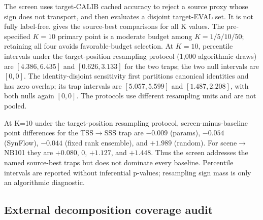 The screen uses target-CALIB cached accuracy to reject a source proxy whose sign
does not transport, and then evaluates a disjoint target-EVAL set. It is not
fully label-free.  gives the source-best comparisons for all
K values. The pre-specified $K=10$ primary point is a moderate budget among
$K=1/5/10/50$; retaining all four avoids favorable-budget selection. At $K=10$,
percentile intervals under the target-position
resampling protocol (1,000 algorithmic draws)
are $[4.386,6.435]$ and $[0.626,3.133]$ for the two traps; the two null intervals
are $[0,0]$. The identity-disjoint sensitivity first partitions canonical
identities and has zero overlap; its trap intervals are $[5.057,5.599]$ and
$[1.487,2.208]$, with both nulls again $[0,0]$. The protocols use different
resampling units and are not pooled.

At K=10 under the target-position resampling protocol,
screen-minus-baseline point
differences for the TSS$\to$SSS trap are $-0.009$ (params), $-0.054$ (SynFlow),
$-0.044$ (fixed rank ensemble), and $+1.989$ (random). For scene$\to$NB101 they
are $+0.080$, $0$, $+1.127$, and $+1.448$. Thus the screen addresses the named
source-best traps but does not dominate every baseline. Percentile intervals are
reported without inferential p-values; resampling sign mass is only an
algorithmic diagnostic.

\begin{table}[t]
\centering\small\setlength{\tabcolsep}{4pt}
\caption{\textbf{Two named traps and two null directions.} Values are point
costs under the frozen target-CALIB/target-EVAL protocol, not average gains.}
\label{tab:r2-search}
\end{table}

\subsection{External decomposition coverage audit}
\label{app:r2-external}

